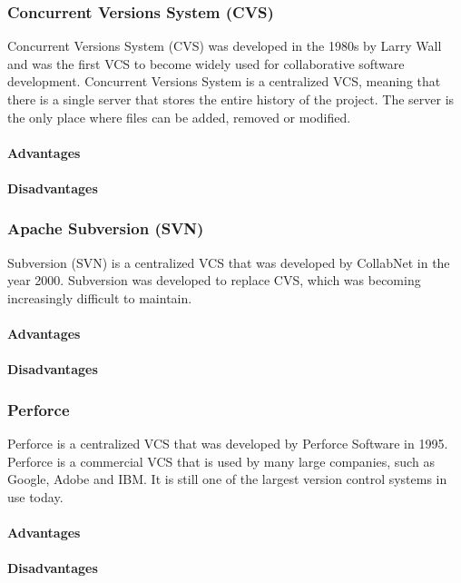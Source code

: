 \subsubsection{Concurrent Versions System (CVS)}
Concurrent Versions System (CVS) was developed in the 1980s by Larry Wall and was the first VCS to become widely used for collaborative software development. Concurrent Versions System is a centralized VCS, meaning that there is a single server that stores the entire history of the project. The server is the only place where files can be added, removed or modified.
\paragraph{Advantages}
\paragraph{Disadvantages}
\subsubsection{Apache Subversion (SVN)}
Subversion (SVN) is a centralized VCS that was developed by CollabNet in the year 2000. Subversion was developed to replace CVS, which was becoming increasingly difficult to maintain.
\paragraph{Advantages}
\paragraph{Disadvantages}
\subsubsection{Perforce}
Perforce is a centralized VCS that was developed by Perforce Software in 1995. Perforce is a commercial VCS that is used by many large companies, such as Google, Adobe and IBM. It is still one of the largest version control systems in use today.
\paragraph{Advantages}
\paragraph{Disadvantages}
